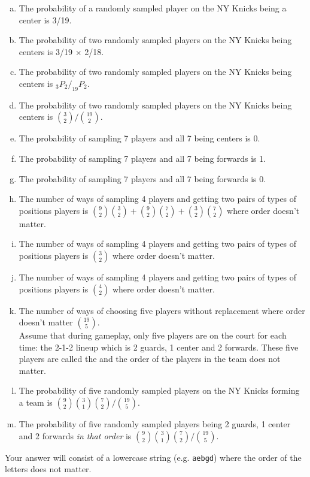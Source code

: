 \documentclass[12pt,landscape]{article}
\newcommand{\instr}{\small Your answer will consist of a lowercase string (e.g. \texttt{aebgd}) where the order of the letters does not matter. \normalsize}
\begin{document}
\vspace{-0.2cm}\benum{} 
\begin{enumerate}[(a)]
\item The probability of a randomly sampled player on the NY Knicks being a center is 3/19.
\item The probability of two randomly sampled players on the NY Knicks being centers is 3/19 $\times$ 2/18.
\item The probability of two randomly sampled players on the NY Knicks being centers is $_3 P_2 / _{19} P_2$.
\item The probability of two randomly sampled players on the NY Knicks being centers is $\binom{3}{2} / \binom{19}{2}$.

\item The probability of sampling 7 players and all 7 being centers is 0.
\item The probability of sampling 7 players and all 7 being forwards is 1.
\item The probability of sampling 7 players and all 7 being forwards is 0.
\item The number of ways of sampling 4 players and getting two pairs of types of positions players is $\binom{9}{2} \binom{3}{2} + \binom{9}{2} \binom{7}{2} + \binom{3}{2} \binom{7}{2}$ where order doesn't matter.
\item The number of ways of sampling 4 players and getting two pairs of types of positions players is $\binom{3}{2}$ where order doesn't matter.
\item The number of ways of sampling 4 players and getting two pairs of types of positions players is $\binom{4}{2}$ where order doesn't matter.

\item The number of ways of choosing five players without replacement where order doesn't matter $\binom{19}{5}$.\\

Assume that during gameplay, only five players are on the court for each time: the 2-1-2 lineup which is 2 guards, 1 center and 2 forwards. These five players are called the  and the order of the players in the team does not matter.




\item The probability of five randomly sampled players on the NY Knicks forming a team is $\binom{9}{2} \binom{3}{1} \binom{7}{2} / \binom{19}{5}$.

\item The probability of five randomly sampled players being 2 guards, 1 center and 2 forwards \emph{in that order} is $\binom{9}{2} \binom{3}{1} \binom{7}{2} / \binom{19}{5}$.

\end{enumerate}
\eenum\instr\pagebreak
\end{document}
